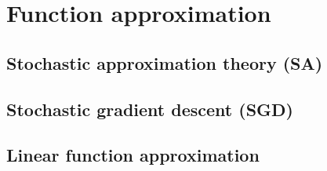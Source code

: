 \section{Function approximation}

\subsection{Stochastic approximation theory (SA)}

\subsection{Stochastic gradient descent (SGD)}

\subsection{Linear function approximation}
